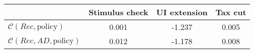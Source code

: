 \begin{tabular}{@{}lccc@{}} 
\toprule 
                          & Stimulus check      & UI extension    & Tax cut    \\  \midrule 
$\mathcal{C}(Rec,\text{policy})$ & 0.001  & -1.237  & 0.005     \\ 
$\mathcal{C}(Rec, AD,\text{policy})$ & 0.012  & -1.178  & 0.008     \\ 
\end{tabular}  
